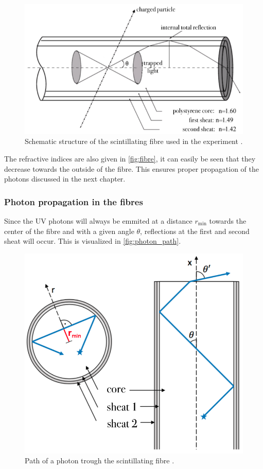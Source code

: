\begin{figure}[H]
	\centering
	\includegraphics[width=0.7\linewidth]{pics/fibre.png}
	\caption{Schematic structure of the scintillating fibre used in the experiment \cite{SciFi}.}
	\label{fig:fibre}
\end{figure}

The refractive indices are also given in \autoref{fig:fibre}, it can easily be seen that they decrease towards the outside
of the fibre. This ensures proper propagation of the photons discussed in the next chapter.

\subsubsection{Photon propagation in the fibres}

Since the UV photons will always be emmited at a distance $r_\text{min}$ towards the center of the fibre and with a given angle $\theta$,
reflections at the first and second sheat will occur. This is visualized in \autoref{fig:photon_path}.

\begin{figure}[H]
	\centering
	\includegraphics[width=0.5\linewidth]{pics/photon_path.png}
	\caption{Path of a photon trough the scintillating fibre \cite{SciFi}.}
	\label{fig:photon_path}
\end{figure}

